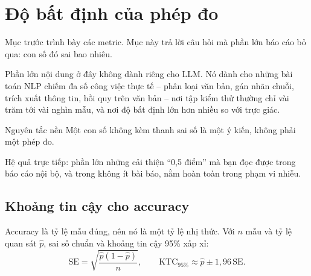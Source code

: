 
\section{Độ bất định của phép đo}
\label{sec:measurement_uncertainty}

Mục trước trình bày các metric. Mục này trả lời câu hỏi mà phần lớn báo cáo bỏ qua: con số đó sai bao nhiêu.

Phần lớn nội dung ở đây không dành riêng cho LLM. Nó dành cho những bài toán NLP chiếm đa số công việc thực tế -- phân loại văn bản, gán nhãn chuỗi, trích xuất thông tin, hồi quy trên văn bản -- nơi tập kiểm thử thường chỉ vài trăm tới vài nghìn mẫu, và nơi độ bất định lớn hơn nhiều so với trực giác.

\begin{keyidea}{Nguyên tắc nền}
Một con số không kèm thanh sai số là một ý kiến, không phải một phép đo.

Hệ quả trực tiếp: phần lớn những cải thiện “0{,}5 điểm” mà bạn đọc được trong báo cáo nội bộ, và trong không ít bài báo, nằm hoàn toàn trong phạm vi nhiễu.
\end{keyidea}

\subsection{Khoảng tin cậy cho accuracy}
\label{ssec:accuracy_ci}

Accuracy là tỷ lệ mẫu đúng, nên nó là một tỷ lệ nhị thức. Với $n$ mẫu và tỷ lệ quan sát $\hat p$, sai số chuẩn và khoảng tin cậy 95\% xấp xỉ:
\begin{equation}
	\mathrm{SE} = \sqrt{\frac{\hat p (1-\hat p)}{n}}, \qquad
	\mathrm{KTC}_{95\%} \approx \hat p \pm 1{,}96\,\mathrm{SE}.
	\label{eq:wald_ci}
\end{equation}

\begin{center}
\label{fig:eval_uncertainty}
\end{center}

